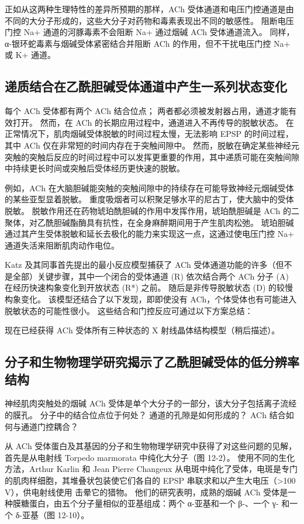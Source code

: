 正如从这两种生理特性的差异所预期的那样，ACh 受体通道和电压门控通道是由不同的大分子形成的，这些大分子对药物和毒素表现出不同的敏感性。 阻断电压门控 Na+ 通道的河豚毒素不会阻断 Na+ 通过烟碱 ACh 受体通道流入。 同样，α-银环蛇毒素与烟碱受体紧密结合并阻断 ACh 的作用，但不干扰电压门控 Na+ 或 K+ 通道。

\subsection{递质结合在乙酰胆碱受体通道中产生一系列状态变化}
每个 ACh 受体都有两个 ACh 结合位点； 两者都必须被发射器占用，通道才能有效打开。 然而，在 ACh 的长期应用过程中，通道进入不再传导的脱敏状态。 在正常情况下，肌肉烟碱受体脱敏的时间过程太慢，无法影响 EPSP 的时间过程，其中 ACh 仅在非常短的时间内存在于突触间隙中。 然而，脱敏在确定某些神经元突触的突触后反应的时间过程中可以发挥更重要的作用，其中递质可能在突触间隙中持续更长时间或突触后受体经历更快速的脱敏。

例如，ACh 在大脑胆碱能突触的突触间隙中的持续存在可能导致神经元烟碱受体的某些亚型显着脱敏。 重度吸烟者可以积聚足够水平的尼古丁，使大脑中的受体脱敏。 脱敏作用还在药物琥珀酰胆碱的作用中发挥作用，琥珀酰胆碱是 ACh 的二聚体，对乙酰胆碱酯酶具有抗性，在全身麻醉期间用于产生肌肉松弛。 琥珀胆碱通过其产生受体脱敏和延长去极化的能力来实现这一点，这通过使电压门控 Na+ 通道失活来阻断肌肉动作电位。

Katz 及其同事首先提出的最小反应模型捕获了 ACh 受体通道功能的许多（但不是全部）关键步骤，其中一个闭合的受体通道 (R) 依次结合两个 ACh 分子 (A) 在经历快速构象变化到开放状态 (R*) 之前。 随后是非传导脱敏状态 (D) 的较慢构象变化。 该模型还结合了以下发现，即即使没有 ACh，个体受体也有可能进入脱敏状态的可能性很小。 这些结合和门控反应可通过以下方案总结：

现在已经获得 ACh 受体所有三种状态的 X 射线晶体结构模型（稍后描述）。


\subsection{分子和生物物理学研究揭示了乙酰胆碱受体的低分辨率结构}

神经肌肉突触处的烟碱 ACh 受体是单个大分子的一部分，该大分子包括离子流经的膜孔。 分子中的结合位点位于何处？ 通道的孔隙是如何形成的？ ACh 结合如何与通道门控耦合？

从 ACh 受体蛋白及其基因的分子和生物物理学研究中获得了对这些问题的见解，首先是从电射线 Torpedo marmorata 中纯化大分子（图 12-2）。 使用不同的生化方法，Arthur Karlin 和 Jean Pierre Changeux 从电斑中纯化了受体，电斑是专门的肌肉样细胞，其堆叠状包装使它们各自的 EPSP 串联求和以产生大电压（>100 V），供电射线使用 击晕它的猎物。 他们的研究表明，成熟的烟碱 ACh 受体是一种膜糖蛋白，由五个分子量相似的亚基组成：两个 α-亚基和一个 β-、一个 γ- 和一个 δ-亚基（图 12-10）。

